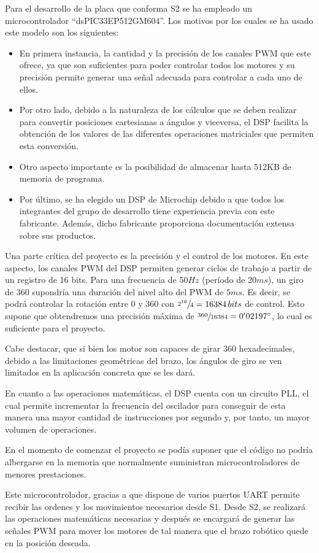 Para el desarrollo de la placa que conforma \ac{S2} se ha empleado un microcontrolador ``dsPIC33EP512GM604''.
Los motivos por los cuales se ha usado este modelo son los siguientes: 

\begin{itemize}
 \item En primera instancia, la cantidad y la precisión de los canales \ac{PWM} que este ofrece, ya que son suficientes para poder controlar todos los motores y su precisión permite generar una señal adecuada para controlar a cada uno de ellos.

 \item Por otro lado, debido a la naturaleza de los cálculos que se deben realizar para convertir posiciones cartesianas a ángulos y viceversa, el \ac{DSP} facilita la obtención de los valores de las diferentes operaciones matriciales que permiten esta conversión.

 \item Otro aspecto importante es la posibilidad de almacenar hasta 512KB de memoria de programa.

 \item Por último, se ha elegido un \ac{DSP} de Microchip debido a que todos los integrantes del grupo de desarrollo tiene experiencia previa con este fabricante. Además, dicho fabricante proporciona documentación extensa sobre sus productos.
\end{itemize}

Una parte crítica del proyecto es la precisión y el control de los motores. En este aspecto, los canales \ac{PWM} del \ac{DSP} permiten generar ciclos de trabajo a partir de un registro de 16 bits. Para una frecuencia de $50Hz$ (período de $20ms$), un giro de 360\degree{} supondría una duración del nivel alto del \ac{PWM} de $5ms$. Es decir, se podrá controlar la rotación entre 0\degree{} y 360\degree{} con $\sfrac{2^{16}}{4} = 16384\,bits$ de control. Esto supone que obtendremos una precisión máxima de $\sfrac{360}{16384} = 0'02197\degree{}$, lo cual es suficiente para el proyecto.

Cabe destacar, que si bien los motor son capaces de girar 360\degree{} hexadecimales, debido a las limitaciones geométricas del brazo, los ángulos de giro se ven limitados en la aplicación concreta que se les dará.

En cuanto a las operaciones matemáticas, el \ac{DSP} cuenta con un circuito \ac{PLL}, el cual permite incrementar la frecuencia del oscilador para conseguir de esta manera una mayor cantidad de instrucciones por segundo y, por tanto, un mayor volumen de operaciones.

En el momento de comenzar el proyecto se podía suponer que el código no podría albergarse en la memoria que normalmente suministran microcontroladores de menores prestaciones.

Este microcontrolador, gracias a que dispone de varios puertos \ac{UART} permite recibir las ordenes y los movimientos necesarios desde \ac{S1}. Desde \ac{S2}, se realizará las operaciones matemáticas necesarias y después se encargará de generar las señales \ac{PWM} para mover los motores de tal manera que el brazo robótico quede en la posición deseada.
